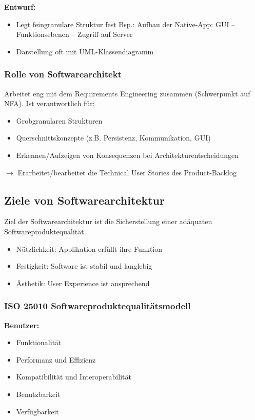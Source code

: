 \textbf{Entwurf:}
\begin{itemize}[topsep=0pt, leftmargin=3mm]
    \setlength\itemsep{-0.3em}
    \item Legt feingranulare Struktur fest
    \SubItem Bsp.: Aufbau der Native-App: GUI – Funktionsebenen – Zugriff auf Server
    \item Darstellung oft mit UML-Klassendiagramm
\end{itemize}

\subsubsection{Rolle von Softwarearchitekt}
Arbeitet eng mit dem Requirements Engineering zusammen (Schwerpunkt auf NFA). Ist verantwortlich für:
\begin{itemize}[topsep=0pt, leftmargin=3mm]
    \setlength\itemsep{-0.3em}
    \item Grobgranularen Strukturen
    \item Querschnittskonzepte (z.B. Persistenz, Kommunikation, GUI)
    \item Erkennen/Aufzeigen von Konsequenzen bei Architekturentscheidungen
\end{itemize}
$\rightarrow$ Erarbeitet/bearbeitet die Technical User Stories des Product-Backlog

\subsection{Ziele von Softwarearchitektur}
Ziel der Softwarearchitektur ist die Sicherstellung einer adäquaten Softwareproduktequalität.
\begin{itemize}[topsep=0pt, leftmargin=3mm]
    \setlength\itemsep{-0.3em}
    \item Nützlichkeit: Applikation erfüllt ihre Funktion
    \item Festigkeit: Software ist stabil und langlebig
    \item Ästhetik: User Experience ist ansprechend
\end{itemize}

\subsubsection{ISO 25010 Softwareproduktequalitätsmodell}
\textbf{Benutzer:}
\begin{itemize}[topsep=0pt, leftmargin=3mm]
    \setlength\itemsep{-0.3em}
    \item Funktionalität
    \item Performanz und Effizienz
    \item Kompatibilität und Interoperabilität
    \item Benutzbarkeit
    \item Verfügbarkeit
\end{itemize}

